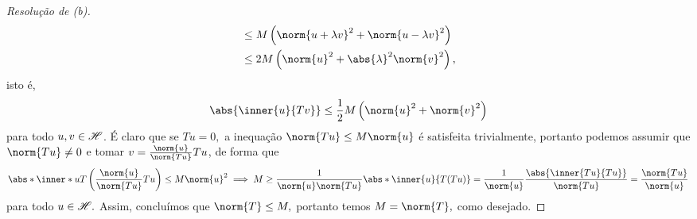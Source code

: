 \begin{proof}[Resolução de (b)]
\begin{align*}
                          &\leq M \left(\norm{u + \lambda v}^2 + \norm{u - \lambda v}^2\right)\\
                          &\leq 2M \left(\norm{u}^2 + \abs{\lambda}^2 \norm{v}^2\right),
  \end{align*}
  isto é,
  \begin{equation*}
    \abs{\inner{u}{Tv}} \leq \frac12 M \left(\norm{u}^2 + \norm{v}^2\right)
  \end{equation*}
  para todo \(u, v \in \mathscr{H}\). É claro que se \(Tu = 0,\) a inequação \(\norm{Tu} \leq M \norm{u}\) é satisfeita trivialmente, portanto podemos assumir que \(\norm{Tu} \neq 0\) e tomar \(v = \frac{\norm{u}}{\norm{Tu}}Tu\), de forma que
  \begin{equation*}
    \abs*{\inner*{u}{T\left(\frac{\norm{u}}{\norm{Tu}}Tu\right)}} \leq M \norm{u}^2  \implies M \geq \frac{1}{\norm{u}\norm{Tu}}\abs*{\inner{u}{T(Tu)}} = \frac{1}{\norm{u}} \frac{\abs{\inner{Tu}{Tu}}}{\norm{Tu}} = \frac{\norm{Tu}}{\norm{u}}
  \end{equation*}
  para todo \(u \in \mathscr{H}.\) Assim, concluímos que \(\norm{T} \leq M,\) portanto temos \(M = \norm{T},\) como desejado.
\end{proof}
